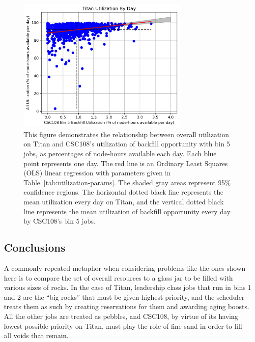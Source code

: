 \begin{figure}
  \includegraphics[width=0.75\textwidth]{images/linfit-utilization-by-true-day-bin5.png}
\caption{This figure demonstrates the relationship between overall utilization
on Titan and CSC108's utilization of backfill opportunity with bin 5 jobs, as
percentages of node-hours available each day. Each blue point represents one
day. The red line is an Ordinary Least Squares (OLS) linear regression with
parameters given in Table~\ref{tab:utilization-params}. The shaded gray areas
represent 95\% confidence regions. The horizontal dotted black line represents
the mean utilization every day on Titan, and the vertical dotted black line
represents the mean utilization of backfill opportunity every day by CSC108's
bin 5 jobs.}
\label{fig:utilization-bin5}
\end{figure}


\subsection{Conclusions}
\label{subsec:sec4-conclusions}

A commonly repeated metaphor when considering problems like the ones shown here
is to compare the set of overall resources to a glass jar to be filled with
various sizes of rocks. In the case of Titan, leadership class jobs that run in
bins 1 and 2 are the ``big rocks'' that must be given highest priority, and the
scheduler treats them as such by creating reservations for them and awarding
aging boosts. All the other jobs are treated as pebbles, and CSC108, by virtue
of its having lowest possible priority on Titan, must play the role of fine
sand in order to fill all voids that remain.

